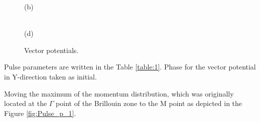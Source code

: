 \begin{figure}[h!]
\begin{minipage}[h]{0.5\linewidth}
\end{minipage}
\begin{minipage}[h]{0.5\linewidth}
 (b) \\
\end{minipage}
\hfill
\begin{minipage}[h]{0.5\linewidth}
 \\(d)
\end{minipage}
\caption{Vector potentials.}
\label{fig:Pulses_1}
\end{figure}

Pulse parameters are written in the Table \ref{table:1}. Phase for the vector potential in Y-direction taken as initial. 

Moving the maximum of the momentum distribution, which was originally located at the $\Gamma$ point of the Brillouin zone to the M point as depicted in the Figure \ref{fig:Pulse_p_1}. 


